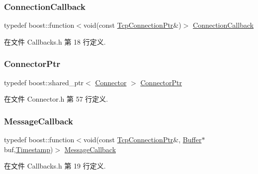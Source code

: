 \mbox{\label{namespacemuduo_ac7f7b0c9c9e96123dfea3fe120a2c404}} 
\subsubsection{\texorpdfstring{Connection\+Callback}{ConnectionCallback}}
{\footnotesize\ttfamily typedef boost\+::function$<$void(const \hyperlink{namespacemuduo_a40c45128e9700d337d92f3cbb8dd4a0a}{Tcp\+Connection\+Ptr}\&)$>$ \hyperlink{namespacemuduo_ac7f7b0c9c9e96123dfea3fe120a2c404}{Connection\+Callback}}



在文件 Callbacks.\+h 第 18 行定义.

\mbox{\label{namespacemuduo_a144f8adea97b4c9ac75c439f6d87ae29}} 
\subsubsection{\texorpdfstring{Connector\+Ptr}{ConnectorPtr}}
{\footnotesize\ttfamily typedef boost\+::shared\+\_\+ptr$<$ \hyperlink{classmuduo_1_1Connector}{Connector} $>$ \hyperlink{namespacemuduo_a144f8adea97b4c9ac75c439f6d87ae29}{Connector\+Ptr}}



在文件 Connector.\+h 第 57 行定义.

\mbox{\label{namespacemuduo_ab8a96fa483cffe150618e01058e6fc1b}} 
\subsubsection{\texorpdfstring{Message\+Callback}{MessageCallback}}
{\footnotesize\ttfamily typedef boost\+::function$<$void(const \hyperlink{namespacemuduo_a40c45128e9700d337d92f3cbb8dd4a0a}{Tcp\+Connection\+Ptr}\&, \hyperlink{classmuduo_1_1Buffer}{Buffer}$\ast$ buf,\hyperlink{classmuduo_1_1Timestamp}{Timestamp})$>$ \hyperlink{namespacemuduo_ab8a96fa483cffe150618e01058e6fc1b}{Message\+Callback}}



在文件 Callbacks.\+h 第 19 行定义.

